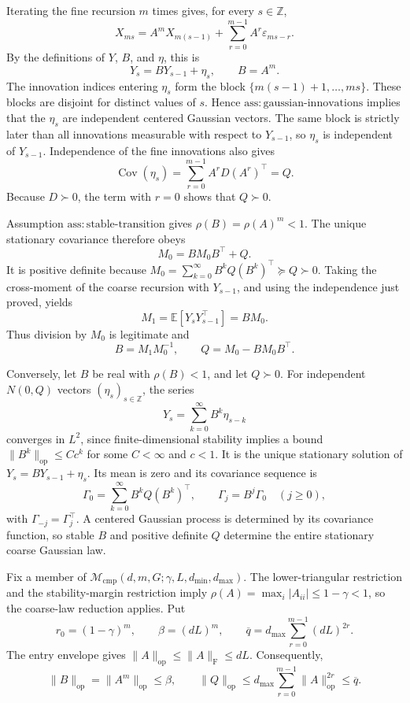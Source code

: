Iterating the fine recursion \(m\) times gives, for every \(s\in\mathbb Z\),
\[
 X_{ms}=A^mX_{m(s-1)}+\sum_{r=0}^{m-1}A^r\varepsilon_{ms-r}.
\]
By the definitions of \(Y\), \(B\), and \(\eta\), this is
\[
 Y_s=BY_{s-1}+\eta_s,
 \qquad B=A^m.
\]
The innovation indices entering \(\eta_s\) form the block
\(\{m(s-1)+1,\ldots,ms\}\). These blocks are disjoint for distinct values of
\(s\). Hence \(\mathrm{ass{:}gaussian\mbox{-}innovations}\) implies that the
\(\eta_s\) are independent centered Gaussian vectors. The same block is
strictly later than all innovations measurable with respect to
\(Y_{s-1}\), so \(\eta_s\) is independent of \(Y_{s-1}\). Independence of
the fine innovations also gives
\[
 \operatorname{Cov}(\eta_s)
 =\sum_{r=0}^{m-1}A^rD(A^r)^\top=Q.
\]
Because \(D\succ0\), the term with \(r=0\) shows that \(Q\succ0\).

Assumption \(\mathrm{ass{:}stable\mbox{-}transition}\) gives
\(\rho(B)=\rho(A)^m<1\). The unique stationary covariance therefore obeys
\[
 M_0=BM_0B^\top+Q.
\]
It is positive definite because
\(M_0=\sum_{k=0}^{\infty}B^kQ(B^k)^\top\succeq Q\succ0\). Taking the
cross-moment of the coarse recursion with \(Y_{s-1}\), and using the
independence just proved, yields
\[
 M_1=\mathbb E[Y_sY_{s-1}^\top]=BM_0.
\]
Thus division by \(M_0\) is legitimate and
\[
 B=M_1M_0^{-1},
 \qquad Q=M_0-BM_0B^\top.
\]

Conversely, let \(B\) be real with \(\rho(B)<1\), and let \(Q\succ0\).
For independent \(N(0,Q)\) vectors \((\eta_s)_{s\in\mathbb Z}\), the series
\[
 Y_s=\sum_{k=0}^{\infty}B^k\eta_{s-k}
\]
converges in \(L^2\), since finite-dimensional stability implies a bound
\(\lVert B^k\rVert_{\mathrm{op}}\le Cc^k\) for some \(C<\infty\) and
\(c<1\). It is the unique stationary solution of
\(Y_s=BY_{s-1}+\eta_s\). Its mean is zero and its covariance sequence is
\[
 \Gamma_0=\sum_{k=0}^{\infty}B^kQ(B^k)^\top,
 \qquad \Gamma_j=B^j\Gamma_0\quad(j\ge0),
\]
with \(\Gamma_{-j}=\Gamma_j^\top\). A centered Gaussian process is determined
by its covariance function, so stable \(B\) and positive definite \(Q\)
determine the entire stationary coarse Gaussian law.

Fix a member of \(\mathcal M_{\mathrm{cmp}}(d,m,G;\gamma,L,d_{\min},d_{\max})\).
The lower-triangular restriction and the stability-margin restriction imply
\(\rho(A)=\max_i|A_{ii}|\le1-\gamma<1\), so the coarse-law reduction applies.
Put
\[
 r_0=(1-\gamma)^m,
 \qquad \beta=(dL)^m,
 \qquad
 \overline q=d_{\max}\sum_{r=0}^{m-1}(dL)^{2r}.
\]
The entry envelope gives
\(\lVert A\rVert_{\mathrm{op}}\le\lVert A\rVert_{\mathrm F}\le dL\).
Consequently,
\[
 \lVert B\rVert_{\mathrm{op}}=\lVert A^m\rVert_{\mathrm{op}}\le\beta,
 \qquad
 \lVert Q\rVert_{\mathrm{op}}
 \le d_{\max}\sum_{r=0}^{m-1}\lVert A\rVert_{\mathrm{op}}^{2r}
 \le\overline q.
\]

